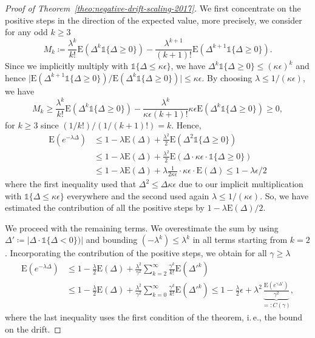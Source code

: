 \documentclass[11pt, a4paper]{article}
\newcommand*{\E}{\mathrm{E}}
\newcommand{\ie}{i.\,e.\xspace}
\newcommand{\indic}[1]{\mathds{1}\{#1\}}
\begin{document}
\begin{proof}[Proof of {Theorem~\ref{theo:negative-drift-scaling-2017}}]
		We first concentrate on the positive steps in the direction of the expected value, more precisely, we consider
		for any odd $k\ge 3$ 
		\[
		M_k \coloneqq \frac{\lambda^{k}}{k!} \E(\Delta^k\indic{\Delta\ge 0}) - \frac{\lambda^{k+1}}{(k+1)!} \E(\Delta^{k+1}\indic{\Delta\ge 0}).
	\]
	Since we implicitly multiply with $\indic{\Delta\le \kappa\epsilon}$, we have $\Delta^k\indic{\Delta\ge 0}\le (\kappa\epsilon)^k$ and hence 
	$\lvert\E(\Delta^{k+1}\indic{\Delta\ge 0})/\E(\Delta^k\indic{\Delta\ge 0})\rvert \le \kappa\epsilon$. By choosing $\lambda\le 1/(\kappa\epsilon)$, 
	we have 
	\[
	M_k\ge \frac{\lambda^k}{k!} \E(\Delta^k\indic{\Delta\ge 0}) - 
	\frac{\lambda^{k}}{\kappa\epsilon (k+1)!} \kappa\epsilon\E(\Delta^{k}\indic{\Delta\ge 0}) \ge 0,
	\]
	for $k\ge 3$ since $(1/k!)/(1/(k+1)!)=k$. Hence,
	\begin{align*}
     \E(e^{-\lambda \Delta}) & \le 1- \lambda\E(\Delta) + \frac{\lambda^2 }{2} \E(\Delta^2\indic{\Delta\ge 0}) \\
		& \le 1- \lambda\E(\Delta) + \frac{\lambda^2 }{2} \E(\Delta\cdot \kappa\epsilon\cdot \indic{\Delta\ge 0})\\
		& \le 1-\lambda\E(\Delta) + \lambda \frac{1}{2\kappa\epsilon}\cdot \kappa\epsilon \cdot \E(\Delta)  
		\le 1-\lambda\epsilon/2
	\end{align*}
	where the first inequality used that $\Delta^{2}\le \Delta\kappa\epsilon$ due to our implicit multiplication 
	with $\indic{\Delta\le \kappa\epsilon}$ everywhere and the second 
	used again $\lambda\le 1/(\kappa\epsilon)$.
	So,  we 
	have estimated the contribution of all the positive steps by $1-\lambda\E(\Delta)/2$. 
	
	We proceed with the remaining terms. We overestimate the sum by using $\Delta'\coloneqq \lvert \Delta \cdot \indic{\Delta<0})\rvert$ 
	and bounding $(-\lambda^k)\le \lambda^k$ in 
	all terms starting from $k=2$. Incorporating the contribution of the positive steps, we   
   obtain for all $\gamma\ge
  \lambda$
  \begin{align*}
  \E(e^{-\lambda \Delta})  & \le
    1 - \frac{\lambda}{2} \E(\Delta) + \frac{\lambda^2}{\gamma^2} \sum_{k=2}^\infty \frac{\gamma^{k}}{k!} \E(\Delta'^k)\\
     & \le
		1 - \frac{\lambda}{2} \E(\Delta)+ \frac{\lambda^2}{\gamma^2} \sum_{k=0}^\infty \frac{\gamma^{k}}{k!} \E(\Delta'^k) 
		 \le 1 -\frac{\lambda}{2} \epsilon + \lambda^2  \underbrace{\frac{\E(e^{\gamma \Delta'})}{\gamma^2}}_{=:C(\gamma)},
  \end{align*}
	where the last inequality uses the first condition of the theorem, \ie, the bound on the drift.
 

\end{proof}
\end{document}
